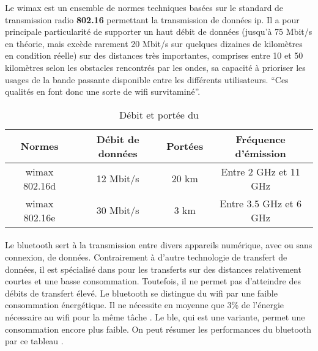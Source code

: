 Le \gls{wimax} est un ensemble de normes techniques basées sur le standard de transmission radio \textbf{802.16}
permettant la transmission de données \gls{ip}.\newline
Il a pour principale particularité de supporter un haut débit de données (jusqu’à 75 Mbit/s en théorie, mais
excède rarement 20 Mbit/s sur quelques dizaines de kilomètres en condition réelle) sur des distances très importantes,
comprises entre 10 et 50 kilomètres selon les obstacles rencontrés par les ondes, sa capacité à prioriser les usages de
la bande passante disponible entre les différents utilisateurs. \enquote{Ces qualités en font donc une sorte
    de \gls{wifi} survitaminé}{\cite{wimax}}.

\begin{table}[ht!]
    \centering
    \begin{tabular}{|c|c|c|c|}
        \hline
        \rowcolor{tableColorDark} Normes & Débit de données & Portées & Fréquence d'émission   \\
        \hline

        \gls{wimax} 802.16d              & 12 Mbit/s        & 20 km   & Entre 2 GHz et 11 GHz  \\\hline
        \gls{wimax} 802.16e              & 30 Mbit/s        & 3 km    & Entre 3.5 GHz et 6 GHz \\\hline
    \end{tabular}
    \label{tab:debitPorteeWimax}
    \caption{Débit et portée du }
    \nocite{debitPortee}
\end{table}


\paragraph{}
\label{sec:bluetooth}

Le \gls{bluetooth} sert à la transmission entre divers appareils numérique, avec ou sans connexion,
de données. Contrairement à d'autre technologie de transfert de données, il est
spécialisé dans pour les transferts sur des distances relativement courtes et une basse
consommation. Toutefois, il ne permet pas d'atteindre des débits de transfert élevé.\newline
Le \gls{bluetooth} se distingue du \gls{wifi} par une faible consommation énergétique. Il
ne nécessite en moyenne que 3\% de l'énergie nécessaire au \gls{wifi} pour la même tâche \cite{bluetoothConsumption}.
Le \gls{ble}, qui est une variante, permet une consommation encore plus faible.\newline
On peut résumer les performances du \gls{bluetooth} par ce tableau \cite{debitPortee, ble}.

